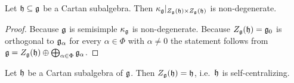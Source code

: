 \begin{corollary}\label{cor: restriction of killing form to centralizer is non-degenerate}
 Let $\mathfrak{h} \subseteq \mathfrak{g}$ be a Cartan subalgebra. Then $\kappa_{\mathfrak{g}}|_{Z_{\mathfrak{g}}(\mathfrak{h}) \times Z_{\mathfrak{g}}(\mathfrak{h})}$ is non-degenerate.
\end{corollary}
\begin{proof}
 Because $\mathfrak{g}$ is semisimple $\kappa_{\mathfrak{g}}$ is non-degenerate. Because $Z_{\mathfrak{g}}(\mathfrak{h}) = \mathfrak{g}_0$ is orthogonal to $\mathfrak{g}_\alpha$ for every $\alpha \in \Phi$ with $\alpha \neq 0$ the statement follows from $\mathfrak{g} = Z_{\mathfrak{g}}(\mathfrak{h}) \oplus \bigoplus_{\alpha \in \Phi} \mathfrak{g}_\alpha$.
\end{proof}




\begin{proposition}\label{prop: CSA are self-centralizing}
 Let $\mathfrak{h}$ be a Cartan subalgebra of $\mathfrak{g}$. Then $Z_{\mathfrak{g}}(\mathfrak{h}) = \mathfrak{h}$, i.e.\ $\mathfrak{h}$ is self-centralizing.
\end{proposition}

